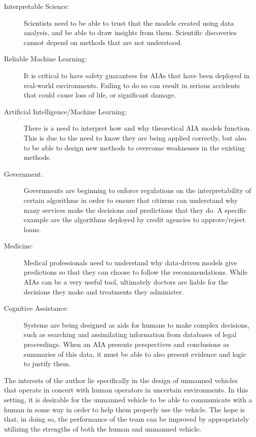 %
    \begin{description}
        \item [Interpretable Science:] Scientists need to be able to trust that the models created using data analysis, and be able to draw insights from them. Scientific discoveries cannot depend on methods that are not understood.
        \item [Reliable Machine Learning:] It is critical to have safety guarantees for AIAs that have been deployed in real-world environments. Failing to do so can result in serious accidents that could cause loss of life, or significant damage.
        \item [Artificial Intelligence/Machine Learning:] There is a need to interpret how and why theoretical AIA models function. This is due to the need to know they are being applied correctly, but also to be able to design new methods to overcome weaknesses in the existing methods.
        \item [Government:] Governments are beginning to enforce regulations on the interpretability of certain algorithms in order to ensure that citizens can understand why many services make the decisions and predictions that they do. A specific example are the algorithms deployed by credit agencies to approve/reject loans.
        \item [Medicine:] Medical professionals need to understand why data-driven models give predictions so that they can choose to follow the recommendations. While AIAs can be a very useful tool, ultimately doctors are liable for the decisions they make and treatments they administer.
        \item [Cognitive Assistance:] Systems are being designed as aids for humans to make complex decisions, such as searching and assimilating information from databases of legal proceedings. When an AIA presents perspectives and conclusions as summaries of this data, it must be able to also present evidence and logic to justify them.
    \end{description}

    The interests of the author lie specifically in the design of unmanned vehicles that operate in concert with human operators in uncertain environments. In this setting, it is desirable for the unmanned vehicle to be able to communicate with a human in some way in order to help them properly use the vehicle. The hope is that, in doing so, the performance of the team can be improved by appropriately utilizing the strengths of both the human and unmanned vehicle. 

